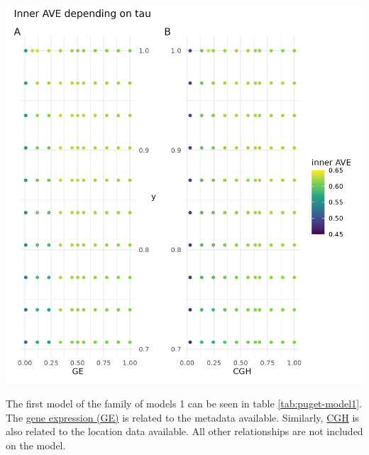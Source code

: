 \documentclass[
  12pt,
  a4paper,
  twoside,
  openright]{book}
\let\origfigure\figure
\let\endorigfigure\endfigure
\renewenvironment{figure}[1][2] {
    \expandafter\origfigure\expandafter[!htbp]
} {
    \endorigfigure
}
\begin{document}
\begin{figure}
\includegraphics[width=1\linewidth]{images/pugets_tau_to_AVE} \caption[Effect of tau on the inner AVE in the Puget dataset.]{Effect of tau on the inner AVE in the Puget dataset. The suggested tau value is the column between the regular grid, on the ordinate axis the y's tau values and on the abscissa the gene expression (GE) on the left and the comparative genomic hybridization (CGH) on the right. The highest inner AVE is with high tau values for y and middle to upper values for GE and CGH.}\label{fig:puget-tau2AVE}
\end{figure}

The first model of the family of models 1 can be seen in table \ref{tab:puget-model1}.
The \protect\hyperlink{acronyms_GE}{gene expression (GE)} is related to the metadata available.
Similarly, \protect\hyperlink{acronyms_CGH}{CGH} is also related to the location data available.
All other relationships are not included on the model.
\end{document}
